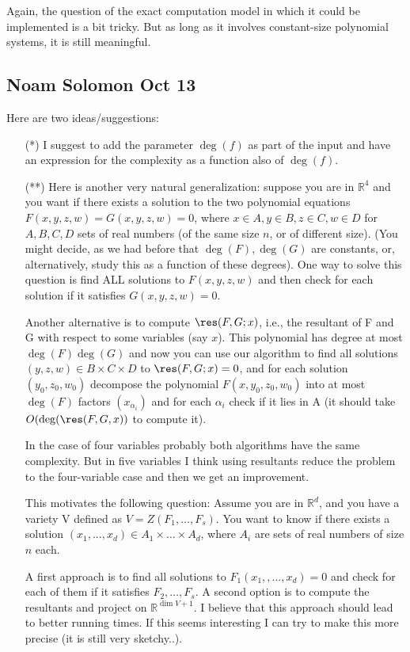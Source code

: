 Again, the question of the exact computation model in which it
could be implemented is a bit tricky. But as long as it involves
constant-size polynomial systems, it is still meaningful.

\subsection{Noam Solomon Oct 13}
Here are two ideas/suggestions:
\begin{itemize}
	\item[(*)] I suggest to add the parameter $\deg(f)$ as part of the input and have an
expression for the complexity as a function also of $\deg(f)$.

	\item[(**)] Here is another very natural generalization: suppose you are in
		$\mathbb{R}^4$
and you want if there exists a solution to the two polynomial equations
$F(x,y,z,w)=G(x,y,z,w)=0$, where $x \in A, y\in B, z\in C, w \in D$ for $A,B,C,D$
sets of real numbers (of the same size $n$, or of different size).
(You might decide, as we had before that $\deg(F), \deg(G)$ are constants,
or, alternatively, study this as a function of these degrees).
One way to solve this question is find ALL solutions to $F(x,y,z,w)$ and then
check for each solution if it satisfies $G(x,y,z,w)=0$.

Another alternative is to compute $\res(F,G; x)$, i.e., the resultant of F and
G with respect to some variables (say $x$). This polynomial has degree at
most $\deg(F)\deg(G)$ and now you can use our algorithm to find all solutions
$(y,z,w) \in B\times C \times D$ to $\res(F,G;x)=0$, and for each solution $(y_0,
z_0, w_0)$ decompose the polynomial $F(x,y_0,z_0,w_0)$ into at most $\deg(F)$
factors $(x_{\alpha_i})$ and for each $\alpha_i$  check if it lies in A (it
should take $O(\deg(\res(F,G,x))$ to compute it).

In the case of four variables probably both algorithms have the same
complexity. But in five variables I think using resultants reduce the
problem to the four-variable case and then we get an improvement.

This motivates the following question: Assume you are in $\mathbb{R}^d$, and you have
a variety V defined as $V=Z(F_1,\ldots, F_s)$. You want to know if there
exists a solution $(x_1,...,x_d)\in A_1 \times \ldots \times
A_d$, where $A_i$
are sets of real numbers of size $n$ each.

A first approach is to find all solutions to $F_1(x_1,,\ldots, x_d)=0$ and
check for each of them if it satisfies $F_2,\ldots, F_s$.
A second option is to compute the resultants and project on $\mathbb{R}^{\dim V + 1}$.
I believe that this approach should lead to better running times. If this
seems interesting I can try to make this more precise (it is still very
sketchy..).
\end{itemize}

